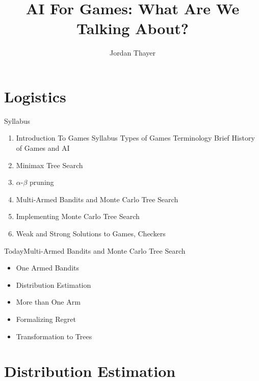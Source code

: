 \documentclass{powerdot}
\title{AI For Games: What Are We Talking About?}
\author{Jordan Thayer}
\date{\vspace{0.2in}}
\begin{document}
\maketitle

\section[slide=false]{Logistics}
\begin{slide}{Syllabus}
  \begin{enumerate}
    \item Introduction To Games
      \subitem Syllabus
      \subitem Types of Games
      \subitem Terminology
      \subitem Brief History of Games and AI
    \item Minimax Tree Search
    \item $\alpha$-$\beta$ pruning
    \item Multi-Armed Bandits and Monte Carlo Tree Search
    \item Implementing Monte Carlo Tree Search
    \item Weak and Strong Solutions to Games, Checkers
  \end{enumerate}
\end{slide}

\begin{slide}{Today\hfill Multi-Armed Bandits and Monte Carlo Tree Search}
  \begin{itemize}
    \item One Armed Bandits
    \item Distribution Estimation
    \item More than One Arm
    \item Formalizing Regret
    \item Transformation to Trees
  \end{itemize}
\end{slide}

\section{Distribution Estimation}
\end{document}
